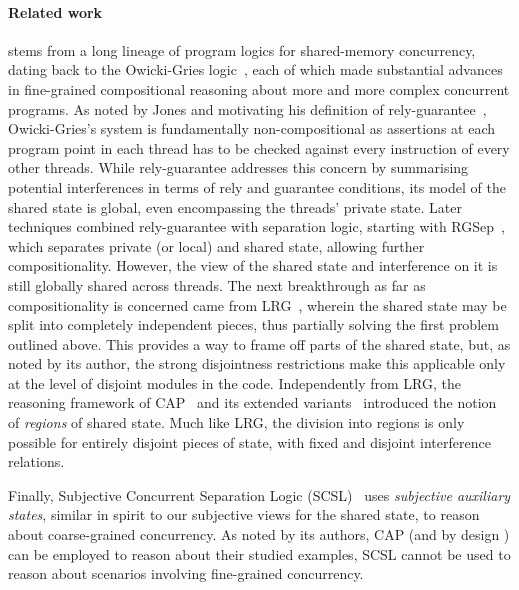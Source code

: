 \paragraph{Related work}
\colosl stems from a long lineage of program logics for shared-memory
concurrency, dating back to the Owicki-Gries logic~\cite{owicki}, each of
which made substantial advances in fine-grained compositional
reasoning about more and more complex concurrent programs. As noted by
Jones and motivating his definition of rely-guarantee~\cite{rg},
Owicki-Gries's system is fundamentally non-compositional as assertions
at each program point in each thread has to be checked against every
instruction of every other threads. While rely-guarantee addresses
this concern by summarising potential interferences in terms of rely
and guarantee conditions, its model of the shared state is global,
even encompassing the threads' private state. Later techniques
combined rely-guarantee with separation logic, starting with
RGSep~\cite{viktor-marriage}, which separates private (or local) and
shared state, allowing further compositionality. However, the view of
the shared state and interference on it is still globally shared
across threads. The next breakthrough as far as compositionality is
concerned came from LRG~\cite{lrg}, wherein the shared state may be
split into completely independent pieces, thus partially solving the
first problem outlined above. This provides a way to frame off parts
of the shared state, but, as noted by its author, the strong
disjointness restrictions make this applicable only at the level of
disjoint modules in the code. Independently from LRG, the reasoning
framework of CAP~\cite{cap-ecoop10}
and its extended variants~\cite{icap,tada} introduced the notion
of \emph{regions} of shared state. Much like LRG, the division into
regions is only possible for entirely disjoint pieces of state, with
fixed and disjoint interference relations.

Finally, Subjective Concurrent Separation Logic (SCSL)~\cite{SCSL}
uses \emph{subjective auxiliary states}, similar in spirit to our
subjective views for the shared state, to reason about coarse-grained
concurrency. As noted by its authors, CAP (and by design \colosl) can
be employed to reason about their studied examples, SCSL cannot be
used to reason about scenarios involving fine-grained concurrency.
